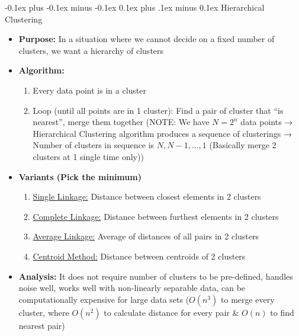 \documentclass[landscape]{article}
\makeatletter
\renewcommand{\subsection}{\@startsection{subsection}{2}{0mm}%
  {-0.1ex plus -0.1ex minus -0.1ex}%
  {0.1ex plus .1ex minus 0.1ex}%
{\normalfont\scriptsize\bfseries}}
\makeatother
\begin{document}
\begin{multicols*}{5}
        \subsection{Hierarchical Clustering}
        \begin{itemize}
          \item \textbf{Purpose:} In a situation where we cannot decide on a fixed number of clusters, we want a hierarchy of clusters
          \item \textbf{Algorithm:}
          \begin{enumerate}
            \item Every data point is in a cluster
            \item Loop (until all points are in 1 cluster): Find a pair of cluster that “is nearest”, merge them together (NOTE: We have $N=2^n$ data points → Hierarchical Clustering algorithm produces a sequence of clusterings → Number of clusters in sequence is $N, N-1, ..., 1$ (Basically merge 2 clusters at 1 single time only))
          \end{enumerate}
          \item \textbf{Variants (Pick the minimum)}
          \begin{enumerate}
            \item \underline{Single Linkage:} Distance between closest elements in 2 clusters
            \item \underline{Complete Linkage:} Distance between furthest elements in 2 clusters
            \item \underline{Average Linkage:} Average of distances of all pairs in 2 clusters
            \item \underline{Centroid Method:} Distance between centroids of 2 clusters
          \end{enumerate}
          \item \textbf{Analysis:} It does not require number of clusters to be pre-defined, handles noise well, works well with non-linearly separable data, can be computationally expensive for large data sets ($O(n^3)$ to merge every cluster, where $O(n^2)$ to calculate distance for every pair \& $O(n)$ to find nearest pair) 
        \end{itemize}


\end{multicols*}
\end{document}
